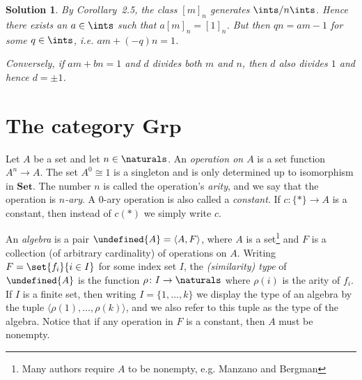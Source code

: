 \documentclass[article, a4paper, 11pt, oneside]{memoir}
\let\mathfrak\undefined
\numberwithin{equation}{chapter}
\newcommand{\frakA}{\mathfrak{A}}
\newcommand{\ncat}[1]{\mathbf{#1}} %
\newcommand{\catSet}{\ncat{Set}} %
\newcommand{\catGrp}{\ncat{Grp}} %
\theoremstyle{nonumberplain}
\newtheorem{solution}{Solution}
\begin{document}
\begin{solution}
    By Corollary~2.5, the class $[m]_n$ generates $\ints/n\ints$. Hence there exists an $a \in \ints$ such that $a [m]_n = [1]_n$. But then $qn = am - 1$ for some $q \in \ints$, i.e. $am + (-q)n = 1$.

    Conversely, if $am + bn = 1$ and $d$ divides both $m$ and $n$, then $d$ also divides $1$ and hence $d = \pm 1$.
\end{solution}


\section[The category Grp][The category $\catGrp$]{The category $\catGrp$}

\begin{remarkbreak}
    Let $A$ be a set and let $n \in \naturals$. An \emph{operation on $A$} is a set function $A^n \to A$. The set $A^0 \cong 1$ is a singleton and is only determined up to isomorphism in $\catSet$. The number $n$ is called the operation's \emph{arity}, and we say that the operation is \emph{$n$-ary}. A $0$-ary operation is also called a \emph{constant}. If $c \colon \{*\} \to A$ is a constant, then instead of $c(*)$ we simply write $c$.
    
    An \emph{algebra} is a pair $\frakA = \langle A, F \rangle$, where $A$ is a set\footnote{Many authors require $A$ to be nonempty, e.g. Manzano and Bergman} and $F$ is a collection (of arbitrary cardinality) of operations on $A$. Writing $F = \set{f_i}{i \in I}$ for some index set $I$, the \emph{(similarity) type} of $\frakA$ is the function $\rho \colon I \to \naturals$ where $\rho(i)$ is the arity of $f_i$. If $I$ is a finite set, then writing $I = \{1, \ldots, k\}$ we display the type of an algebra by the tuple $\langle \rho(1), \ldots, \rho(k) \rangle$, and we also refer to this tuple as the type of the algebra. Notice that if any operation in $F$ is a constant, then $A$ must be nonempty.


\end{remarkbreak}
\end{document}
